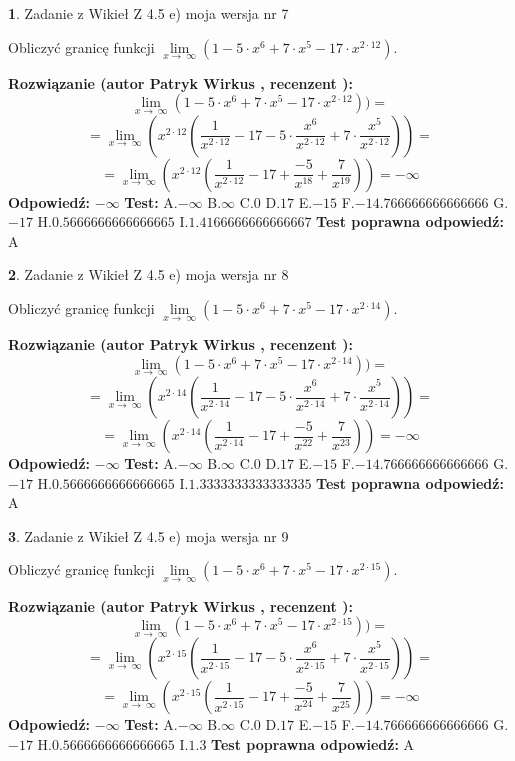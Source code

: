 \documentclass[12pt, a4paper]{article}
\theoremstyle{definition} %
\newtheorem{zad}{}
\newcommand{\zadStart}[1]{\begin{zad}#1\newline}
\newcommand{\zadStop}{\end{zad}}
\newcommand{\rozwStart}[2]{\noindent \textbf{Rozwiązanie (autor #1 , recenzent #2): }\newline}
\newcommand{\rozwStop}{\newline}
\newcommand{\odpStart}{\noindent \textbf{Odpowiedź:}\newline}
\newcommand{\odpStop}{\newline}
\newcommand{\testStart}{\noindent \textbf{Test:}\newline}
\newcommand{\testStop}{\newline}
\newcommand{\kluczStart}{\noindent \textbf{Test poprawna odpowiedź:}\newline}
\newcommand{\kluczStop}{\newline}
\begin{document}
\zadStart{Zadanie z Wikieł Z 4.5 e) moja wersja nr 7}


Obliczyć granicę funkcji  $\lim\limits_{x\to\ \infty}(1 - 5 \cdot x^{6}+7 \cdot x^{5}- 17 \cdot x^{2\cdot12})$.
\zadStop
\rozwStart{Patryk Wirkus}{}
$$\lim\limits_{x\to\ \infty}(1 - 5 \cdot x^{6}+7 \cdot x^{5}- 17 \cdot x^{2\cdot12}))=$$
$$=\lim\limits_{x\to\ \infty}(x^{2\cdot12}(\frac{1}{x^{2\cdot12}}-17 -5 \cdot \frac{x^{6}}{x^{2\cdot12}}+7 \cdot \frac{x^{5}}{x^{2\cdot12}}))=$$
$$=\lim\limits_{x\to\ \infty}(x^{2\cdot12}(\frac{1}{x^{2\cdot12}}-17 + \frac{-5}{x^{18}}+ \frac{7}{x^{19}}))=-\infty$$
\rozwStop
\odpStart
$-\infty$
\odpStop
\testStart
A.$-\infty$ B.$\infty$ C.$0$ D.$17$ E.$-15$
F.$-14.766666666666666$ G.$-17$
H.$0.5666666666666665$
I.$1.4166666666666667$
\testStop
\kluczStart
A
\kluczStop



\zadStart{Zadanie z Wikieł Z 4.5 e) moja wersja nr 8}


Obliczyć granicę funkcji  $\lim\limits_{x\to\ \infty}(1 - 5 \cdot x^{6}+7 \cdot x^{5}- 17 \cdot x^{2\cdot14})$.
\zadStop
\rozwStart{Patryk Wirkus}{}
$$\lim\limits_{x\to\ \infty}(1 - 5 \cdot x^{6}+7 \cdot x^{5}- 17 \cdot x^{2\cdot14}))=$$
$$=\lim\limits_{x\to\ \infty}(x^{2\cdot14}(\frac{1}{x^{2\cdot14}}-17 -5 \cdot \frac{x^{6}}{x^{2\cdot14}}+7 \cdot \frac{x^{5}}{x^{2\cdot14}}))=$$
$$=\lim\limits_{x\to\ \infty}(x^{2\cdot14}(\frac{1}{x^{2\cdot14}}-17 + \frac{-5}{x^{22}}+ \frac{7}{x^{23}}))=-\infty$$
\rozwStop
\odpStart
$-\infty$
\odpStop
\testStart
A.$-\infty$ B.$\infty$ C.$0$ D.$17$ E.$-15$
F.$-14.766666666666666$ G.$-17$
H.$0.5666666666666665$
I.$1.3333333333333335$
\testStop
\kluczStart
A
\kluczStop



\zadStart{Zadanie z Wikieł Z 4.5 e) moja wersja nr 9}


Obliczyć granicę funkcji  $\lim\limits_{x\to\ \infty}(1 - 5 \cdot x^{6}+7 \cdot x^{5}- 17 \cdot x^{2\cdot15})$.
\zadStop
\rozwStart{Patryk Wirkus}{}
$$\lim\limits_{x\to\ \infty}(1 - 5 \cdot x^{6}+7 \cdot x^{5}- 17 \cdot x^{2\cdot15}))=$$
$$=\lim\limits_{x\to\ \infty}(x^{2\cdot15}(\frac{1}{x^{2\cdot15}}-17 -5 \cdot \frac{x^{6}}{x^{2\cdot15}}+7 \cdot \frac{x^{5}}{x^{2\cdot15}}))=$$
$$=\lim\limits_{x\to\ \infty}(x^{2\cdot15}(\frac{1}{x^{2\cdot15}}-17 + \frac{-5}{x^{24}}+ \frac{7}{x^{25}}))=-\infty$$
\rozwStop
\odpStart
$-\infty$
\odpStop
\testStart
A.$-\infty$ B.$\infty$ C.$0$ D.$17$ E.$-15$
F.$-14.766666666666666$ G.$-17$
H.$0.5666666666666665$
I.$1.3$
\testStop
\kluczStart
A
\kluczStop
\end{document}
